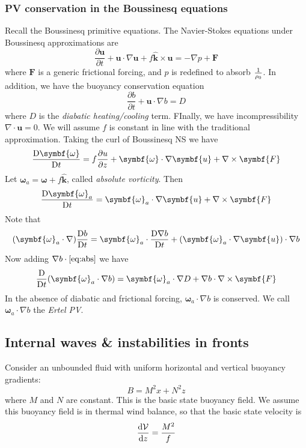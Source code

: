 \documentclass{jknotes}
\begin{document}
\subsubsection{PV conservation in the Boussinesq equations}
Recall the Boussinesq primitive equations. The Navier-Stokes equations under
Boussinesq approximations are
\begin{equation}
	\frac{\partial \symbf{u}}{\partial t} + \symbf{u}\cdot \nabla \symbf{u} +
	f \hat{\symbf{k}} \times \symbf{u} = -\nabla p + \symbf{F}
\end{equation}
where $\symbf{F}$ is a generic frictional forcing, and $p$ is redefined to
absorb $\frac{1}{\rho_0}$. In addition, we have the buoyancy conservation equation
\begin{equation}
	\frac{\partial b}{\partial t} + \symbf{u} \cdot \nabla b = D
\end{equation}
where $D$ is the \emph{diabatic heating/cooling} term. FInally, we have
incompressibility $\nabla \cdot \symbf{u} = 0$. We will assume $f$ is constant
in line with the traditional approximation. Taking the curl of Boussinesq NS
we have
\begin{equation}
	\frac{\diffD \symbf{\omega}}{\diffD t} = f\frac{\partial u}{\partial z} +
	\symbf{\omega} \cdot \nabla \symbf{u} + \nabla \times \symbf{F}
\end{equation}
Let $\symbf{\omega}_a = \symbf{\omega} + f\hat{\symbf{k}}$, called
\emph{absolute vorticity}. Then
\begin{equation}
	\frac{\diffD \symbf{\omega}_a}{\diffD t} = \symbf{\omega}_a \cdot \nabla
	\symbf{u} + \nabla \times \symbf{F} \label{eq:abs}
\end{equation}
Note that
\begin{equation}
	(\symbf{\omega}_a\cdot\nabla)\frac{\diffD b}{\diffD t} = \symbf{\omega}_a
	\cdot \frac{\diffD \nabla b}{\diffD t} + (\symbf{\omega}_a \cdot \nabla
	\symbf{u})\cdot\nabla b
\end{equation}
Now adding $\nabla b \cdot \eqref{eq:abs}$ we have
\begin{equation}
	\frac{\diffD}{\diffD t} (\symbf{\omega}_a \cdot \nabla b) =
	\symbf{\omega}_a \cdot \nabla D + \nabla b \cdot \nabla \times \symbf{F}
\end{equation}
In the absence of diabatic and frictional forcing, $\symbf{\omega}_a \cdot
\nabla b$ is conserved. We call $\symbf{\omega}_a \cdot \nabla b$ the
\emph{Ertel PV}.

\subsection{Internal waves \& instabilities in fronts}
Consider an unbounded fluid with uniform horizontal and vertical buoyancy
gradients:
\begin{equation}
	B = M^2 x + N^2 z
\end{equation}
where $M$ and $N$ are constant. This is the basic state buoyancy field. We
assume this buoyancy field is in thermal wind balance, so that the basic state
velocity is
\begin{equation}
	\frac{\diffd \mathcal{V}}{\diffd z} = \frac{M^2}{f}
\end{equation}
\end{document}
